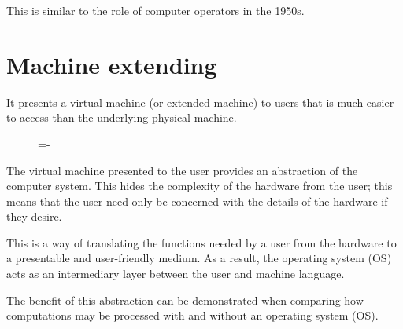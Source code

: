 \documentclass[a4paper]{systems-software}
\begin{document}
This is similar to the role of computer operators in the 1950s.


\section*{Machine extending}

It presents a virtual machine (or extended machine) to users that is much easier to access than the underlying physical machine.

\begin{figure}[H]
  \lineskip=-\fboxrule
\end{figure}

The virtual machine presented to the user provides an abstraction of the computer system. This hides the complexity of the hardware from the user; this means that the user need only be concerned with the details of the hardware if they desire.

This is a way of translating the functions needed by a user from the hardware to a presentable and user-friendly medium. As a result, the operating system (OS) acts as an intermediary layer between the user and machine language.

The benefit of this abstraction can be demonstrated when comparing how computations may be processed with and without an operating system (OS).
\end{document}
